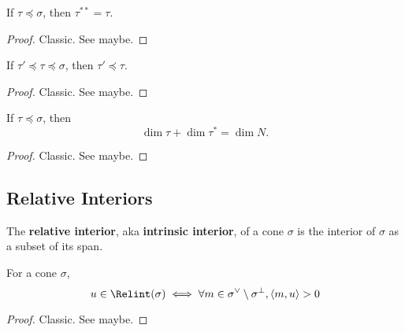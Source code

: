 \begin{proposition}
  \label{1-2-10-double-dual-face-dual-face}

  If $\tau \preceq \sigma$, then $\tau^{**} = \tau$.
\end{proposition}
\begin{proof}

  Classic. See \cite{Oda_1988} maybe.
\end{proof}


\begin{proposition}
  \label{1-2-10-dual-face-antitone}

  If $\tau' \preceq \tau \preceq \sigma$, then $\tau' \preceq \tau$.
\end{proposition}
\begin{proof}
  \uses{}

  Classic. See \cite{Oda_1988} maybe.
\end{proof}


\begin{proposition}
  \label{1-2-10-dim-dual-face}

  If $\tau \preceq \sigma$, then
  $$\dim \tau + \dim \tau^* = \dim N.$$
\end{proposition}
\begin{proof}
  \uses{}

  Classic. See \cite{Oda_1988} maybe.
\end{proof}


\subsection{Relative Interiors}


\begin{definition}
  \label{1-2-rel-interior}
  \uses{}
  \leanok

  The {\bf relative interior}, aka {\bf intrinsic interior}, of a cone $\sigma$ is the interior of $\sigma$ as a subset of its span.
\end{definition}


\begin{lemma}
  \label{1-2-rel-interior-inner}

  For a cone $\sigma$,
  $$u \in \Relint(\sigma) \iff \forall m \in \sigma^\vee \setminus \sigma^\perp, \langle m, u\rangle > 0$$
\end{lemma}
\begin{proof}
  \uses{}

  Classic. See \cite{Oda_1988} maybe.
\end{proof}


